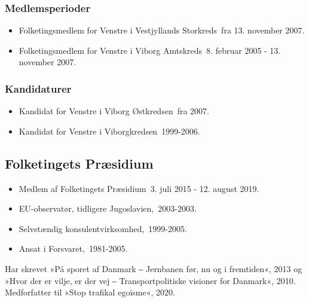 \documentclass[11pt, a4paper]{awesome-cv}
\begin{document}
\begin{cvletter}
\subsubsection*{Medlemsperioder}
\begin{itemize}
\item Folketingsmedlem for Venstre i Vestjyllands Storkreds fra 13. november 2007.
\item Folketingsmedlem for Venstre i Viborg Amtskreds 8. februar 2005 - 13. november 2007.
\end{itemize}
\subsubsection*{Kandidaturer}
\begin{itemize}
\item Kandidat for Venstre i Viborg Østkredsen fra 2007.
\item Kandidat for Venstre i Viborgkredsen 1999-2006.
\end{itemize}
\subsection*{Folketingets Præsidium}
\begin{itemize}
\item Medlem af Folketingets Præsidium 3. juli 2015 - 12. august 2019.
\end{itemize}
\begin{itemize}
\item EU-observatør, tidligere Jugoslavien, 2003-2003.
\item Selvstændig konsulentvirksomhed, 1999-2005.
\item Ansat i Forsvaret, 1981-2005.
\end{itemize}
Har skrevet »På sporet af Danmark ‒ Jernbanen før, nu og i fremtiden«, 2013 og »Hvor der er vilje, er der vej ‒ Transportpolitiske visioner for Danmark«, 2010. Medforfatter til »Stop trafikal egoisme«, 2020. 

\end{cvletter}
\end{document}
